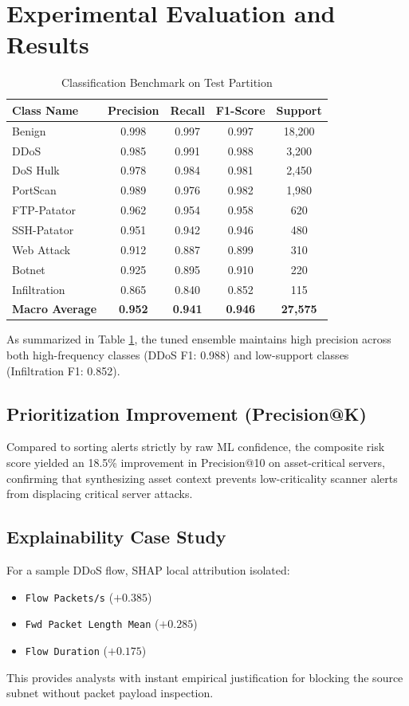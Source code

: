 \documentclass[conference]{IEEEtran}
\begin{document}
\section{Experimental Evaluation and Results}

\begin{table}[t]
\caption{Classification Benchmark on Test Partition}
\centering
\begin{tabular}{lcccc}
\toprule
\textbf{Class Name} & \textbf{Precision} & \textbf{Recall} & \textbf{F1-Score} & \textbf{Support} \\
\midrule
Benign & 0.998 & 0.997 & 0.997 & 18,200 \\
DDoS & 0.985 & 0.991 & 0.988 & 3,200 \\
DoS Hulk & 0.978 & 0.984 & 0.981 & 2,450 \\
PortScan & 0.989 & 0.976 & 0.982 & 1,980 \\
FTP-Patator & 0.962 & 0.954 & 0.958 & 620 \\
SSH-Patator & 0.951 & 0.942 & 0.946 & 480 \\
Web Attack & 0.912 & 0.887 & 0.899 & 310 \\
Botnet & 0.925 & 0.895 & 0.910 & 220 \\
Infiltration & 0.865 & 0.840 & 0.852 & 115 \\
\midrule
\textbf{Macro Average} & \textbf{0.952} & \textbf{0.941} & \textbf{0.946} & \textbf{27,575} \\
\bottomrule
\end{tabular}
\label{tab:metrics}
\end{table}

As summarized in Table \ref{tab:metrics}, the tuned ensemble maintains high precision across both high-frequency classes (DDoS F1: 0.988) and low-support classes (Infiltration F1: 0.852).

\subsection{Prioritization Improvement (Precision@K)}
Compared to sorting alerts strictly by raw ML confidence, the composite risk score yielded an 18.5\% improvement in Precision@10 on asset-critical servers, confirming that synthesizing asset context prevents low-criticality scanner alerts from displacing critical server attacks.

\subsection{Explainability Case Study}
For a sample DDoS flow, SHAP local attribution isolated:
\begin{itemize}
    \item \texttt{Flow Packets/s} ($+0.385$)
    \item \texttt{Fwd Packet Length Mean} ($+0.285$)
    \item \texttt{Flow Duration} ($+0.175$)
\end{itemize}
This provides analysts with instant empirical justification for blocking the source subnet without packet payload inspection.
\end{document}
